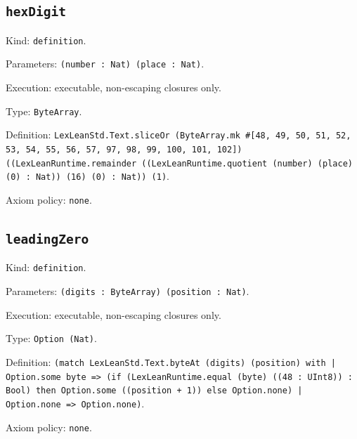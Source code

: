 \documentclass[11pt]{article}
\begin{document}
\subsection*{\texttt{hexDigit}}
\noindent Kind: \texttt{definition}.\par
\noindent Parameters: \texttt{(number : Nat) (place : Nat)}.\par
\noindent Execution: executable, non-escaping closures only.\par
\noindent Type: \texttt{ByteArray}.\par
\noindent Definition: \texttt{LexLeanStd.Text.sliceOr (ByteArray.mk \#[48, 49, 50, 51, 52, 53, 54, 55, 56, 57, 97, 98, 99, 100, 101, 102]) ((LexLeanRuntime.remainder ((LexLeanRuntime.quotient (number) (place) (0) : Nat)) (16) (0) : Nat)) (1)}.\par
\noindent Axiom policy: \texttt{none}.\par
\subsection*{\texttt{leadingZero}}
\noindent Kind: \texttt{definition}.\par
\noindent Parameters: \texttt{(digits : ByteArray) (position : Nat)}.\par
\noindent Execution: executable, non-escaping closures only.\par
\noindent Type: \texttt{Option (Nat)}.\par
\noindent Definition: \texttt{(match LexLeanStd.Text.byteAt (digits) (position) with | Option.some byte => (if (LexLeanRuntime.equal (byte) ((48 : UInt8)) : Bool) then Option.some ((position + 1)) else Option.none) | Option.none => Option.none)}.\par
\noindent Axiom policy: \texttt{none}.\par
\end{document}
